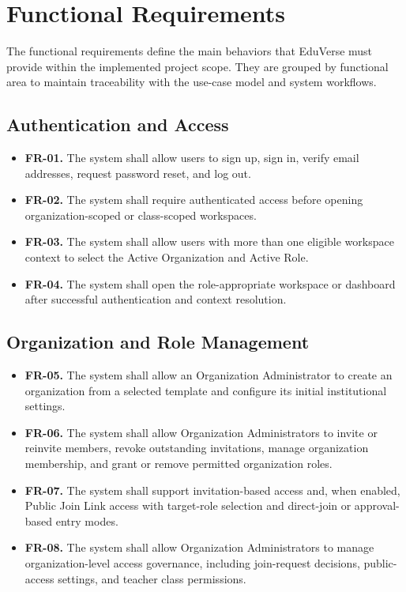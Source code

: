 \section{Functional Requirements}\label{sec:functional_requirements}

The functional requirements define the main behaviors that EduVerse must
provide within the implemented project scope. They are grouped by functional
area to maintain traceability with the use-case model and system workflows.

\subsection*{Authentication and Access}

\begin{itemize}
  \item \textbf{FR-01.} The system shall allow users to sign up, sign in,
    verify email addresses, request password reset, and log out.
  \item \textbf{FR-02.} The system shall require authenticated access before
    opening organization-scoped or class-scoped workspaces.
  \item \textbf{FR-03.} The system shall allow users with more than one
    eligible workspace context to select the Active Organization and Active
    Role.
  \item \textbf{FR-04.} The system shall open the role-appropriate workspace
    or dashboard after successful authentication and context resolution.
\end{itemize}

\subsection*{Organization and Role Management}

\begin{itemize}
  \item \textbf{FR-05.} The system shall allow an Organization Administrator
    to create an organization from a selected template and configure its
    initial institutional settings.
  \item \textbf{FR-06.} The system shall allow Organization Administrators to
    invite or reinvite members, revoke outstanding invitations, manage
    organization membership, and grant or remove permitted organization roles.
  \item \textbf{FR-07.} The system shall support invitation-based access and,
    when enabled, Public Join Link access with target-role selection and
    direct-join or approval-based entry modes.
  \item \textbf{FR-08.} The system shall allow Organization Administrators to
    manage organization-level access governance, including join-request
    decisions, public-access settings, and teacher class permissions.
\end{itemize}

